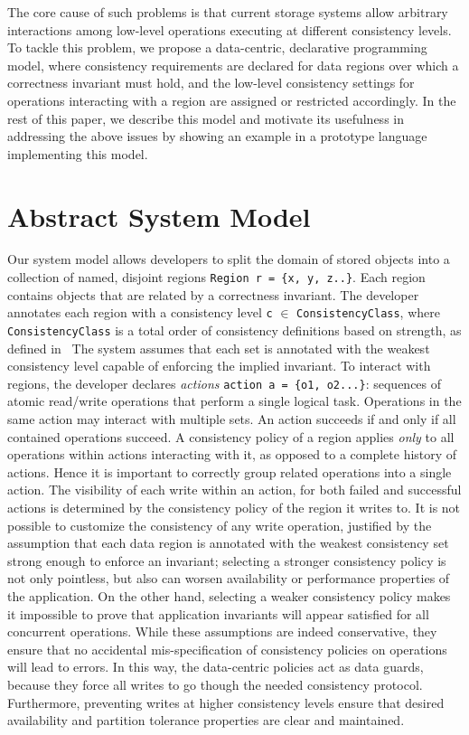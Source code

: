 \documentclass[preprint, numbers]{sigplanconf}
\begin{document}
The core cause of such problems is that current storage systems allow arbitrary
interactions among low-level operations executing at different consistency levels. To
tackle this problem, we propose a data-centric, declarative programming model, where
consistency requirements are declared for data regions over which a correctness
invariant must hold, and the low-level consistency settings for operations interacting with
a region are assigned or restricted accordingly. In the rest of this paper, we describe this
model and motivate its usefulness in addressing the above issues by showing
an example in a prototype language implementing this model.

\section{Abstract System Model}
Our system model allows developers to split the domain of stored objects into a
collection of named, disjoint
regions \texttt{Region r = \{x, y, z..\}}. Each
region contains objects that are related by a correctness invariant. The
developer annotates each region with a consistency level \texttt{c} $\in$
\texttt{ConsistencyClass}, where \texttt{ConsistencyClass} is a total order of
consistency definitions based on strength, as defined in~\cite{sivaramakrishnan2015declarative} The system assumes that each
set is annotated with the weakest consistency level capable of
enforcing the implied invariant. To interact with regions, the developer
declares \emph{actions} \texttt{action a = \{o1, o2...\}}: sequences of atomic
read/write operations that perform a single logical task.
Operations in the same action may interact with multiple sets. An action succeeds if and only if
all contained operations succeed. A consistency policy of a region applies
\emph{only} to all operations within actions interacting with it, as opposed to a complete
history of actions. Hence it is important to
correctly group related operations into a single action. The visibility
of each write within an action, for both failed and successful
actions is determined by the consistency policy of the region it writes to. It
is not possible to customize the consistency of any write operation, justified
by the assumption that each data region is annotated with the weakest
consistency set strong enough to enforce an invariant; selecting a stronger
consistency policy is not only pointless, but also can worsen
availability or performance properties of the application. On the other hand,
selecting a weaker consistency policy makes it impossible to prove that
application invariants will appear satisfied for all concurrent operations.
While these assumptions are indeed conservative, they ensure that no accidental
mis-specification of consistency policies on operations will lead to errors. In this way, the
data-centric policies act as data guards, because they force all writes to go
though the needed consistency protocol. Furthermore, preventing writes at higher
consistency levels ensure that desired availability and partition tolerance
properties are clear and maintained. 
\end{document}
